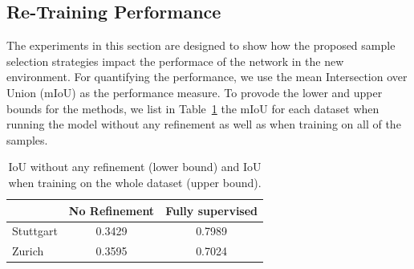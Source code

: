 \documentclass[letterpaper, 10 pt, conference]{ieeeconf}  %
\begin{document}


\subsection{Re-Training Performance}

The experiments in this section are designed to show how the proposed sample selection strategies impact the performace of the network in the new environment. For quantifying the performance, we use the mean Intersection over Union (mIoU) as the performance measure. To provode the lower and upper bounds for the methods, we list in Table~\ref{tab:null_and_fully_supervised}  the mIoU for each dataset when running the model without any refinement as well as when training on all of the samples. 

            \begin{table}
          \vspace{1em}
        \centering
        \caption{IoU without any refinement (lower bound) and IoU when training on the whole dataset (upper bound).}
        \begin{tabular}{@{}lcc@{}} 
            \toprule
              &  No Refinement  & Fully supervised \\ 
            \midrule 
    		  Stuttgart  & 0.3429 & 0.7989  \\ \addlinespace
    		  Zurich  & 0.3595 & 0.7024  \\
    	
            \bottomrule
        \end{tabular}
        \label{tab:null_and_fully_supervised}
    \end{table}
\end{document}
